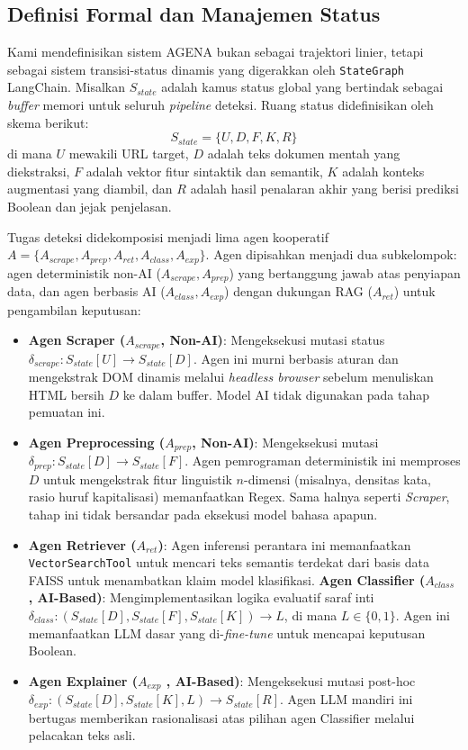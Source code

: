 \documentclass{ieeeaccess}
\begin{document}
\subsection{Definisi Formal dan Manajemen Status}
Kami mendefinisikan sistem AGENA bukan sebagai trajektori linier, tetapi sebagai sistem transisi-status dinamis yang digerakkan oleh \texttt{StateGraph} LangChain. Misalkan $S_{state}$ adalah kamus status global yang bertindak sebagai \textit{buffer} memori untuk seluruh \textit{pipeline} deteksi. Ruang status didefinisikan oleh skema berikut:
\begin{equation}
S_{state} = \{U, D, F, K, R\}
\end{equation}
di mana $U$ mewakili URL target, $D$ adalah teks dokumen mentah yang diekstraksi, $F$ adalah vektor fitur sintaktik dan semantik, $K$ adalah konteks augmentasi yang diambil, dan $R$ adalah hasil penalaran akhir yang berisi prediksi Boolean dan jejak penjelasan.

Tugas deteksi didekomposisi menjadi lima agen kooperatif $A = \{A_{scrape}, A_{prep}, A_{ret}, A_{class}, A_{exp}\}$. Agen dipisahkan menjadi dua subkelompok: agen deterministik non-AI ($A_{scrape}, A_{prep}$) yang bertanggung jawab atas penyiapan data, dan agen berbasis AI ($A_{class}, A_{exp}$) dengan dukungan RAG ($A_{ret}$) untuk pengambilan keputusan:
\begin{itemize}
    \item \textbf{Agen Scraper ($A_{scrape}$, Non-AI)}: Mengeksekusi mutasi status $\delta_{scrape}: S_{state}[U] \rightarrow S_{state}[D]$. Agen ini murni berbasis aturan dan mengekstrak DOM dinamis melalui \textit{headless browser} sebelum menuliskan HTML bersih $D$ ke dalam buffer. Model AI tidak digunakan pada tahap pemuatan ini.
    \item \textbf{Agen Preprocessing ($A_{prep}$, Non-AI)}: Mengeksekusi mutasi $\delta_{prep}: S_{state}[D] \rightarrow S_{state}[F]$. Agen pemrograman deterministik ini memproses $D$ untuk mengekstrak fitur linguistik $n$-dimensi (misalnya, densitas kata, rasio huruf kapitalisasi) memanfaatkan Regex. Sama halnya seperti \textit{Scraper}, tahap ini tidak bersandar pada eksekusi model bahasa apapun.
    \item \textbf{Agen Retriever ($A_{ret}$)}: Agen inferensi perantara ini memanfaatkan \texttt{VectorSearchTool} untuk mencari teks semantis terdekat dari basis data FAISS untuk menambatkan klaim model klasifikasi.
    \textbf{Agen Classifier ($A_{class}$ , AI-Based)}: Mengimplementasikan logika evaluatif saraf inti $\delta_{class}: (S_{state}[D], S_{state}[F], S_{state}[K]) \rightarrow L$, di mana $L \in \{0, 1\}$. Agen ini memanfaatkan LLM dasar yang di-\textit{fine-tune} untuk mencapai keputusan Boolean.
    \item \textbf{Agen Explainer ($A_{exp}$ , AI-Based)}: Mengeksekusi mutasi post-hoc $\delta_{exp}: (S_{state}[D], S_{state}[K], L) \rightarrow S_{state}[R]$. Agen LLM mandiri ini bertugas memberikan rasionalisasi atas pilihan agen Classifier melalui pelacakan teks asli.
\end{itemize}
\end{document}

